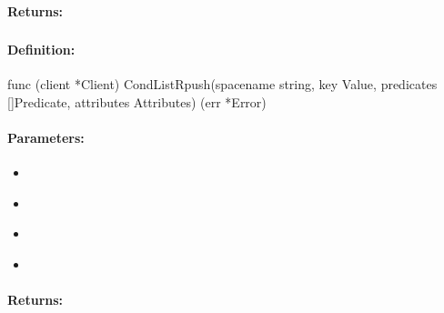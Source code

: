\paragraph{Returns:}


\pagebreak
\subsubsection{}
\label{api:Go:CondListRpush}


\paragraph{Definition:}
\begin{gocode}
func (client *Client) CondListRpush(spacename string, key Value, predicates []Predicate, attributes Attributes) (err *Error)
\end{gocode}

\paragraph{Parameters:}
\begin{itemize}[noitemsep]
\item {}\\

\item {}\\

\item {}\\

\item {}\\

\end{itemize}

\paragraph{Returns:}


\pagebreak
\subsubsection{}
\label{api:Go:GroupListRpush}


